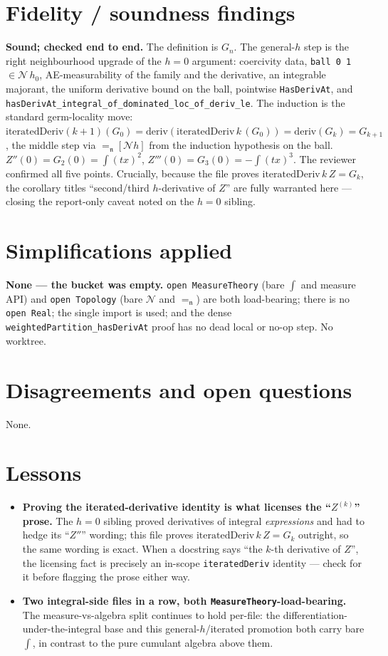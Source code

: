 \documentclass[11pt]{article}
\begin{document}
\section{Fidelity / soundness findings}
\textbf{Sound; checked end to end.} The definition is $G_n$. The general-$h$ step is the right
neighbourhood upgrade of the $h=0$ argument: coercivity data, \texttt{ball 0 1}$\in\mathcal N\,h_0$,
AE-measurability of the family and the derivative, an integrable majorant, the uniform derivative
bound on the ball, pointwise \texttt{HasDerivAt}, and
\texttt{hasDerivAt\_integral\_of\_dominated\_loc\_of\_deriv\_le}. The induction is the standard
germ-locality move: $\mathrm{iteratedDeriv}(k+1)(G_0)=\mathrm{deriv}(\mathrm{iteratedDeriv}\,k\,(G_0))
=\mathrm{deriv}(G_k)=G_{k+1}$, the middle step via $=_{\!\!\mathfrak n}[\mathcal N h]$ from the
induction hypothesis on the ball. $Z''(0)=G_2(0)=\int(tx)^2$, $Z'''(0)=G_3(0)=-\!\int(tx)^3$.
The reviewer confirmed all five points. Crucially, because the file proves
$\mathrm{iteratedDeriv}\,k\,Z=G_k$, the corollary titles ``second/third $h$-derivative of $Z$'' are
fully warranted here --- closing the report-only caveat noted on the $h=0$ sibling.

\section{Simplifications applied}
\textbf{None --- the bucket was empty.} \texttt{open MeasureTheory} (bare $\int$ and measure API)
and \texttt{open Topology} (bare $\mathcal N$ and $=_{\!\!\mathfrak n}$) are both load-bearing;
there is no \texttt{open Real}; the single import is used; and the dense
\texttt{weightedPartition\_hasDerivAt} proof has no dead local or no-op step. No worktree.

\section{Disagreements and open questions}
None.

\section{Lessons}
\begin{itemize}[noitemsep]
  \item \textbf{Proving the iterated-derivative identity is what licenses the ``$Z^{(k)}$'' prose.}
    The $h=0$ sibling proved derivatives of integral \emph{expressions} and had to hedge its
    ``$Z''$'' wording; this file proves $\mathrm{iteratedDeriv}\,k\,Z=G_k$ outright, so the same
    wording is exact. When a docstring says ``the $k$-th derivative of $Z$'', the licensing fact is
    precisely an in-scope \texttt{iteratedDeriv} identity --- check for it before flagging the prose
    either way.
  \item \textbf{Two integral-side files in a row, both \texttt{MeasureTheory}-load-bearing.} The
    measure-vs-algebra split continues to hold per-file: the differentiation-under-the-integral base
    and this general-$h$/iterated promotion both carry bare $\int$, in contrast to the pure cumulant
    algebra above them.
\end{itemize}
\end{document}
